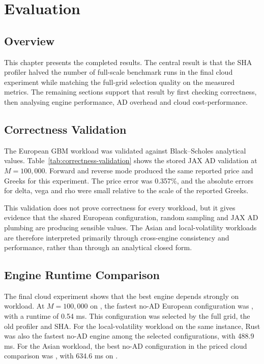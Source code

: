 \chapter{Evaluation}
\label{chap:evaluation}

\section{Overview}

This chapter presents the completed results. The central result is that the SHA profiler halved the number of full-scale benchmark runs in the final cloud experiment while matching the full-grid selection quality on the measured metrics. The remaining sections support that result by first checking correctness, then analysing engine performance, AD overhead and cloud cost-performance.

\section{Correctness Validation}

The European GBM workload was validated against Black--Scholes analytical values. Table~\ref{tab:correctness-validation} shows the stored JAX AD validation at \(M=100{,}000\). Forward and reverse mode produced the same reported price and Greeks for this experiment. The price error was 0.357\%, and the absolute errors for delta, vega and rho were small relative to the scale of the reported Greeks.



This validation does not prove correctness for every workload, but it gives evidence that the shared European configuration, random sampling and JAX AD plumbing are producing sensible values. The Asian and local-volatility workloads are therefore interpreted primarily through cross-engine consistency and performance, rather than through an analytical closed form.

\section{Engine Runtime Comparison}

The final cloud experiment shows that the best engine depends strongly on workload. At \(M=100{,}000\) on , the fastest no-AD European configuration was , with a runtime of 0.54 ms. This configuration was selected by the full grid, the old profiler and SHA. For the local-volatility workload on the same instance, Rust was also the fastest no-AD engine among the selected configurations, with 488.9 ms. For the Asian workload, the best no-AD configuration in the priced cloud comparison was , with 634.6 ms on .


